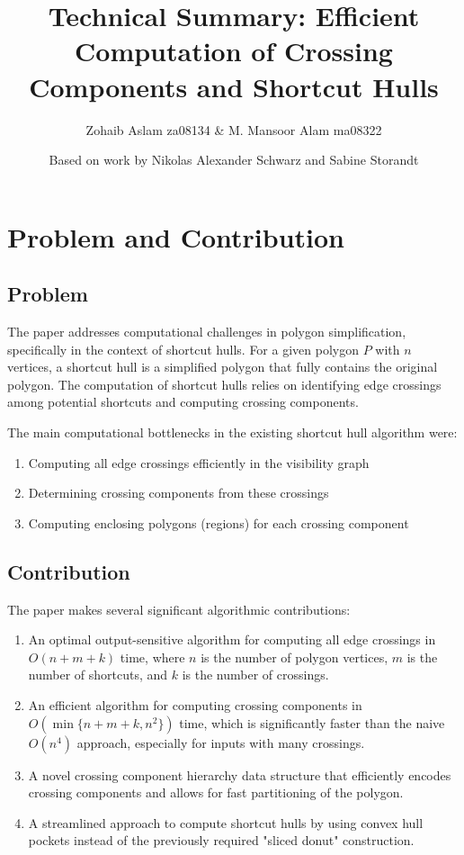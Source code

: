 \documentclass[10pt,letterpaper]{article}
\title{Technical Summary: Efficient Computation of Crossing Components and Shortcut Hulls}
\author{Zohaib Aslam za08134 \&  M. Mansoor Alam ma08322}
\date{Based on work by Nikolas Alexander Schwarz and Sabine Storandt}
\begin{document}
\maketitle

\section{Problem and Contribution}

\subsection{Problem}
The paper addresses computational challenges in polygon simplification, specifically in the context of shortcut hulls. For a given polygon $P$ with $n$ vertices, a shortcut hull is a simplified polygon that fully contains the original polygon. The computation of shortcut hulls relies on identifying edge crossings among potential shortcuts and computing crossing components.

The main computational bottlenecks in the existing shortcut hull algorithm were:
\begin{enumerate}
    \item Computing all edge crossings efficiently in the visibility graph
    \item Determining crossing components from these crossings
    \item Computing enclosing polygons (regions) for each crossing component
\end{enumerate}

\subsection{Contribution}
The paper makes several significant algorithmic contributions:

\begin{enumerate}
    \item An optimal output-sensitive algorithm for computing all edge crossings in $O(n + m + k)$ time, where $n$ is the number of polygon vertices, $m$ is the number of shortcuts, and $k$ is the number of crossings.
    
    \item An efficient algorithm for computing crossing components in $O(\min\{n + m + k, n^2\})$ time, which is significantly faster than the naive $O(n^4)$ approach, especially for inputs with many crossings.
    
    \item A novel crossing component hierarchy data structure that efficiently encodes crossing components and allows for fast partitioning of the polygon.
    
    \item A streamlined approach to compute shortcut hulls by using convex hull pockets instead of the previously required "sliced donut" construction.
\end{enumerate}
\end{document}
